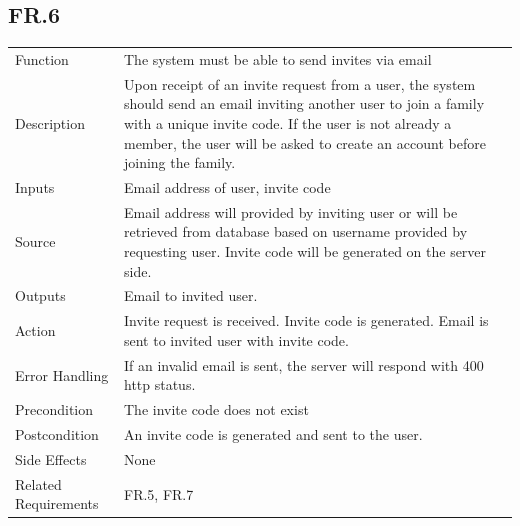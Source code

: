 \documentclass[12pt]{article}
\begin{document}
    \subsection*{FR.6}
    \begin{center}
        \begin{tabular}{| p{10em} p{26em} |}
        \hline
         Function & The system must be able to send invites via email\\
         Description & Upon receipt of an invite request from a user, the system should send an email inviting another user to join a family with a unique invite code. If the user is not already a member, the user will be asked to create an account before joining the family.\\
         Inputs & Email address of user, invite code\\
         Source & Email address will provided by inviting user or will be retrieved from database based on username provided by requesting user. Invite code will be generated on the server side.\\
         Outputs & Email to invited user.\\
         Action & Invite request is received. Invite code is generated. Email is sent to invited user with invite code.\\
         Error Handling & If an invalid email is sent, the server will respond with 400 http status.\\
         Precondition & The invite code does not exist\\
         Postcondition & An invite code is generated and sent to the user.\\
         Side Effects & None\\
         Related Requirements & FR.5, FR.7\\
         \hline
        \end{tabular}
    \end{center}
\end{document}
